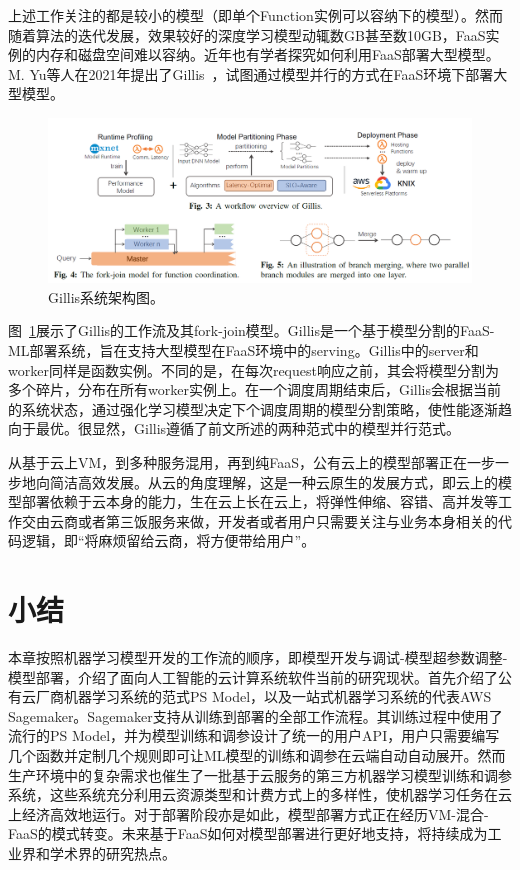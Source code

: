 上述工作关注的都是较小的模型（即单个Function实例可以容纳下的模型）。然而随着算法的迭代发展，效果较好的深度学习模型动辄数GB甚至数10GB，FaaS实例的内存和磁盘空间难以容纳。近年也有学者探究如何利用FaaS部署大型模型。M. Yu等人在2021年提出了Gillis~\parencite{yu2021gillis}，试图通过模型并行的方式在FaaS环境下部署大型模型。

\begin{figure}[h]
    \centerline{\includegraphics[width=\textwidth]{figures/gillis-arch.png}}
    \caption{Gillis系统架构图。}
    \label{gillis_arch}
\end{figure}

图~\ref{gillis_arch}展示了Gillis的工作流及其fork-join模型。Gillis是一个基于模型分割的FaaS-ML部署系统，旨在支持大型模型在FaaS环境中的serving。Gillis中的server和worker同样是函数实例。不同的是，在每次request响应之前，其会将模型分割为多个碎片，分布在所有worker实例上。在一个调度周期结束后，Gillis会根据当前的系统状态，通过强化学习模型决定下个调度周期的模型分割策略，使性能逐渐趋向于最优。很显然，Gillis遵循了前文所述的两种范式中的模型并行范式。

从基于云上VM，到多种服务混用，再到纯FaaS，公有云上的模型部署正在一步一步地向简洁高效发展。从云的角度理解，这是一种云原生的发展方式，即云上的模型部署依赖于云本身的能力，生在云上长在云上，将弹性伸缩、容错、高并发等工作交由云商或者第三饭服务来做，开发者或者用户只需要关注与业务本身相关的代码逻辑，即“将麻烦留给云商，将方便带给用户”。

\section{小结}
本章按照机器学习模型开发的工作流的顺序，即模型开发与调试-模型超参数调整-模型部署，介绍了面向人工智能的云计算系统软件当前的研究现状。首先介绍了公有云厂商机器学习系统的范式PS Model，以及一站式机器学习系统的代表AWS Sagemaker。Sagemaker支持从训练到部署的全部工作流程。其训练过程中使用了流行的PS Model，并为模型训练和调参设计了统一的用户API，用户只需要编写几个函数并定制几个规则即可让ML模型的训练和调参在云端自动自动展开。然而生产环境中的复杂需求也催生了一批基于云服务的第三方机器学习模型训练和调参系统，这些系统充分利用云资源类型和计费方式上的多样性，使机器学习任务在云上经济高效地运行。对于部署阶段亦是如此，模型部署方式正在经历VM-混合-FaaS的模式转变。未来基于FaaS如何对模型部署进行更好地支持，将持续成为工业界和学术界的研究热点。
